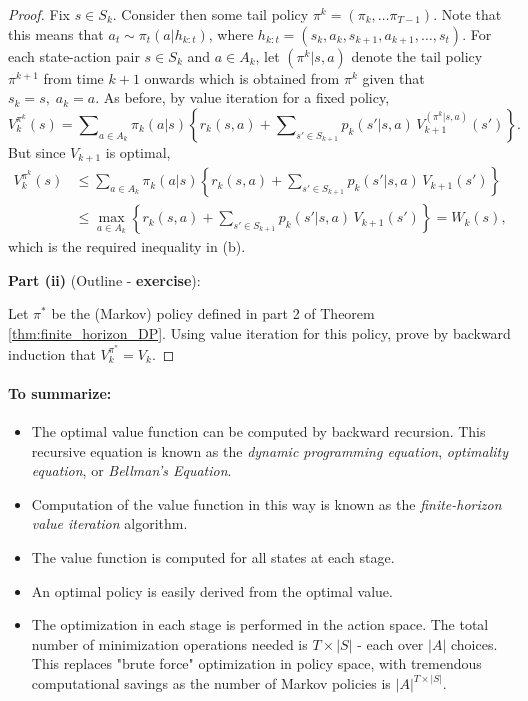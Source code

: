 \begin{proof}
Fix $s \in {S_k}$.
Consider then some tail policy ${\pi ^k} = ({\pi _k}, \ldots {\pi _{T - 1}})$. Note that this means that ${a_t} \sim {\pi _t}(a|{h_{k:t}})$, where ${h_{k:t}} = ({s_k},{a_k},{s_{k + 1}},{a_{k + 1}}, \ldots ,{s_t})$. For each state-action pair $s \in {S_k}$ and $a \in {A_k}$, let  $({\pi ^k}|s,a)$ denote the tail policy ${\pi ^{k + 1}}$ from time $k + 1$ onwards which is obtained from ${\pi ^k}$ given that ${s_k} = s,\;{a_k} = a$. As before, by value iteration for a fixed policy,
\[V_k^{{\pi ^k}}(s) = \sum\nolimits_{a \in {A_k}} {{\pi _k}(a|s)\left\{ {{r_k}(s,a) + \sum\nolimits_{s' \in {S_{k + 1}}} {{p_k}(s'|s,a)} \,V_{k + 1}^{({\pi ^k}|s,a)}(s')} \right\}} .\]
But since $V_{k + 1}^{}$ is optimal,
\begin{align*}
V_k^{{\pi ^k}}(s) &\le \sum\nolimits_{a \in {A_k}} {{\pi _k}(a|s)\left\{ {{r_k}(s,a) + \sum\nolimits_{s' \in {S_{k + 1}}} {{p_k}(s'|s,a)\,} V_{k + 1}^{}(s')} \right\}} \\
 &\le {\max _{a \in {A_k}}}\left\{ {{r_k}(s,a) + \sum\nolimits_{s' \in {S_{k + 1}}} {{p_k}(s'|s,a)\,} V_{k + 1}^{}(s')} \right\} = {W_k}(s),
\end{align*}
which is the required inequality in (b).

\textbf{Part  (ii)} (Outline - \textbf{exercise}):

Let ${\pi ^*}$ be the (Markov) policy defined in part 2 of Theorem \ref{thm:finite_horizon_DP}. Using value iteration for this policy, prove by backward induction that $V_k^{{\pi ^*}} = V_k^{}$.
\end{proof}

\paragraph{To summarize:}
\begin{itemize}
  \item The optimal value function can be computed by backward recursion. This recursive equation is known as the \emph{dynamic programming equation}, \emph{optimality equation}, or \emph{Bellman's Equation}.
  \item Computation of the value function in this way is known as the \emph{finite-horizon value iteration} algorithm.
  \item The value function is computed for all states at each stage.
  \item An optimal policy is easily derived from the optimal value.
  \item The optimization in each stage is performed in the action space.  The total number of minimization operations needed is $T \times |S|$  - each over $|A|$ choices. This replaces "brute force" optimization in policy space, with tremendous computational savings as the number of Markov policies is $|A{|^{T\times |S|}}$.
\end{itemize}

